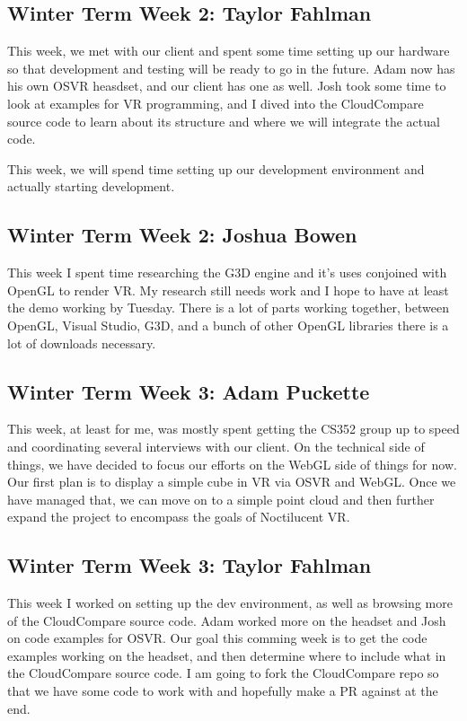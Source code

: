 \documentclass[draftclsnofoot,onecolumn]{IEEEtran}
\begin{document}
\subsection{Winter Term Week 2: Taylor Fahlman}

This week, we met with our client and spent some time setting up our hardware so that development and testing will be ready to go in the future. Adam now has his own OSVR heasdset, and our client has one as well. Josh took some time to look at examples for VR programming, and I dived into the CloudCompare source code to learn about its structure and where we will integrate the actual code.

This week, we will spend time setting up our development environment and actually starting development.

\subsection{Winter Term Week 2: Joshua Bowen}

This week I spent time researching the G3D engine and it's uses conjoined with OpenGL to render VR. My research still needs work and I hope to have at least the demo working by Tuesday. There is a lot of parts working together, between OpenGL, Visual Studio, G3D, and a bunch of other OpenGL libraries there is a lot of downloads necessary.

\subsection{Winter Term Week 3: Adam Puckette}

This week, at least for me, was mostly spent getting the CS352 group up to speed and coordinating several interviews with our client. On the technical side of things, we have decided to focus our efforts on the WebGL side of things for now. Our first plan is to display a simple cube in VR via OSVR and WebGL. Once we have managed that, we can move on to a simple point cloud and then further expand the project to encompass the goals of Noctilucent VR.

\subsection{Winter Term Week 3: Taylor Fahlman}

This week I worked on setting up the dev environment, as well as browsing more of the CloudCompare source code. Adam worked more on the headset and Josh on code examples for OSVR. Our goal this comming week is to get the code examples working on the headset, and then determine where to include what in the CloudCompare source code. I am going to fork the CloudCompare repo so that we have some code to work with and hopefully make a PR against at the end.
\end{document}
